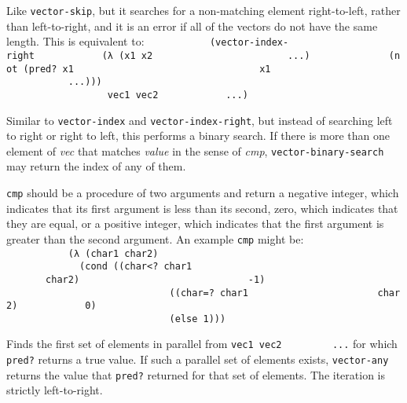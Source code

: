 \begin{entry}{%
  }

  Like
  \texttt{vector-skip}, but it searches for a non-matching element
  right-to-left, rather than left-to-right, and it is an error if all
  of the vectors do not have the same length. This is equivalent to:
  \texttt{~~~~~~~~~~~(vector-index-right~~~~~~~~~~~~(λ~(x1~x2~~~~~~~~~~~~~~~~~~~~~~~~...)~~~~~~~~~~~~~~(not~(pred?~x1~~~~~~~~~~~~~~~~~~~~~~~~~~~~~~~~~x1~~~~~~~~~~~~~~~~~~~~~~~~~~~~~~~~~~...)))~~~~~~~~~~~~~~~~~~~~~~~~~~~~~~~~~~~~~~~~~~~~~~~~~~~~~~~~~~~~~~~~~~~~~~~vec1~vec2~~~~~~~~~~~~...)~~~~~~~~~}
\end{entry}

\begin{entry}{%
  }

  Similar to \texttt{vector-index} and
  \texttt{vector-index-right}, but instead of searching left to right
  or right to left, this performs a binary search. If there is more
  than one element of \emph{vec} that matches \emph{value} in the
  sense of \emph{cmp}, \texttt{vector-binary-search} may return the
  index of any of them.

  \texttt{cmp} should be a procedure of two arguments and return a
  negative integer, which indicates that its first argument is less
  than its second, zero, which indicates that they are equal, or a
  positive integer, which indicates that the first argument is greater
  than the second argument. An example \texttt{cmp} might be:
  \texttt{~~~~~~~~~~~(λ~(char1~char2)~~~~~~~~~}\\
  \texttt{~~~~~~~~~~~~~(cond~((char\textless{}?~char1~~~~~~~~~~~~~~~~~~~~~~~~~~~~~~~~~~~~~~~~~~~~char2)~~~~~~~~~~~~~~~~~~~~~~~~~~~~~~-1)~~~~~~~~~}\\
  \texttt{~~~~~~~~~~~~~~~~~~~~~~~~~~~~~((char=?~char1~~~~~~~~~~~~~~~~~~~~~~~char2)~~~~~~~~~~~~0)~~~~~~~~~}\\
  \texttt{~~~~~~~~~~~~~~~~~~~~~~~~~~~~~(else~1)))~~~~~~~~~}
\end{entry}

\begin{entry}{%
  }

  Finds the first set of elements in parallel from
  \texttt{vec1~vec2~~~~~~~~~...} for which \texttt{pred?}  returns a
  true value. If such a parallel set of elements exists,
  \texttt{vector-any} returns the value that \texttt{pred?} returned
  for that set of elements. The iteration is strictly left-to-right.
\end{entry}

